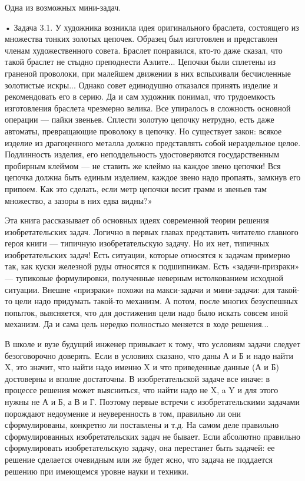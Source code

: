 Одна из возможных мини-задач.

•  Задача  3.1.  У  художника возникла  идея  оригинального  браслета,
состоящего из множества тонких золотых цепочек. Образец был изготовлен
и  представлен  членам  художественного  совета.  Браслет  понравился,
кто-то даже сказал, что такой  браслет не стыдно преподнести Аэлите...
Цепочки  были сплетены  из граненой  проволоки, при  малейшем движении
в  них  вспыхивали  бесчисленные   золотистые  искры...  Однако  совет
единодушно  отказался принять  изделие  и рекомендовать  его в  серию.
Да  и сам  художник  понимал, что  трудоемкость изготовления  браслета
чрезмерно  велика.  Все  упиралось  в сложность  основной  операции  —
пайки звеньев.  Сплести золотую цепочку нетрудно,  есть даже автоматы,
превращающие проволоку в цепочку.  Но существует закон: всякое изделие
из драгоценного металла должно  представлять собой нераздельное целое.
Подлинность изделия, его неподдельность удостоверяются государственным
пробирным клеймом — не ставить же  клеймо на каждое звено цепочки! Вся
цепочка  должна  быть единым  изделием,  каждое  звено надо  пропаять,
замкнув его припоем. Как это сделать,  если метр цепочки весит грамм и
звеньев там множество, а зазоры в них едва видны?»


Эта книга  рассказывает об  основных идеях современной  теории решения
изобретательских задач.  Логично в первых главах  представить читателю
главного героя  книги — типичную  изобретательскую задачу. Но  их нет,
типичных изобретательских  задач! Есть  ситуации, которые  относятся к
задачам примерно так, как куски железной руды относятся к подшипникам.
Есть «задачи-призраки»  — тупиковые формулировки,  полученные неверным
истолкованием   исходной  ситуации.   Внешне   «призраки»  похожи   на
макси-задачи и мини-задачи: для  такой-то цели надо придумать такой-то
механизм. А  потом, после многих безуспешных  попыток, выясняется, что
для достижения цели  надо было искать совсем иной механизм.  Да и сама
цель нередко полностью меняется в ходе решения...

В  школе  и  вузе  будущий  инженер привыкает  к  тому,  что  условиям
задачи  следует  безоговорочно  доверять.  Если  в  условиях  сказано,
что  даны  А  и  Б  и  надо  найти  X,  это  значит,  что  найти  надо
именно  X  и что  приведенные  данные  (А  и  Б) достоверны  и  вполне
достаточны. В  изобретательской задаче  все иначе: в  процессе решения
может  выясниться,  что  найти надо  не  X,  a  Y  и для  этого  нужны
не  А  и Б,  а  В  и Г.  Поэтому  первые  встречи с  изобретательскими
задачами порождают недоумение и неуверенность  в том, правильно ли они
сформулированы, конкретно ли поставлены и т.д. На самом деле правильно
сформулированных  изобретательских  задач  не бывает.  Если  абсолютно
правильно сформулировать изобретательскую  задачу, она перестанет быть
задачей: ее решение сделается очевидным  или же будет ясно, что задача
не поддается решению при имеющемся уровне науки и техники.

